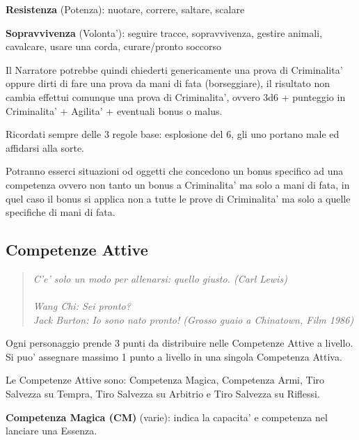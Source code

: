 \documentclass[a4paper,11pt,twoside,openany]{book}
\begin{document}
\textbf{Resistenza} (Potenza): nuotare, correre, saltare, scalare

\textbf{Sopravvivenza} (Volonta'): seguire tracce, sopravvivenza, gestire animali, cavalcare, usare una corda, curare/pronto soccorso

\bigskip

Il Narratore potrebbe quindi chiederti genericamente una prova di Criminalita' oppure dirti di fare una prova da mani di fata (borseggiare), il risultato non cambia effettui comunque una prova di Criminalita', ovvero 3d6 + punteggio in Criminalita' + Agilita' + eventuali bonus
o malus.

Ricordati sempre delle 3 regole base: esplosione del 6, gli uno portano male ed affidarsi alla sorte.

\bigskip

Potranno esserci situazioni od oggetti che concedono un bonus specifico ad una competenza ovvero non tanto un bonus a Criminalita' ma solo a mani di fata, in quel caso il bonus si applica non a tutte le prove di Criminalita' ma solo a quelle specifiche di mani di fata.


\subsection{Competenze Attive}

\label{competenze-attive}
\begin{quote}\textit{C'e' solo un modo per allenarsi: quello giusto. (Carl Lewis)\\\\
Wang Chi: Sei pronto?\\
Jack Burton: Io sono nato pronto! (Grosso guaio a Chinatown, Film 1986)
}\end{quote}

Ogni personaggio prende 3 punti da distribuire nelle Competenze Attive a livello. Si puo' assegnare massimo 1 punto a livello in una singola Competenza Attiva.

Le Competenze Attive sono: Competenza Magica, Competenza Armi, Tiro Salvezza su Tempra, Tiro Salvezza su Arbitrio e Tiro Salvezza su Riflessi.

\textbf{Competenza Magica (CM)} (varie): indica la capacita' e competenza nel lanciare una Essenza.
\end{document}
